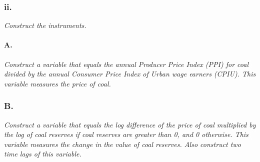 \documentclass[
]{article}
\newenvironment{Shaded}{\begin{snugshade}}{\end{snugshade}}
\newcommand{\CommentTok}[1]{\textcolor[rgb]{0.56,0.35,0.01}{\textit{#1}}}
\newcommand{\ErrorTok}[1]{\textcolor[rgb]{0.64,0.00,0.00}{\textbf{#1}}}
\newcommand{\KeywordTok}[1]{\textcolor[rgb]{0.13,0.29,0.53}{\textbf{#1}}}
\newcommand{\NormalTok}[1]{#1}
\newcommand{\OperatorTok}[1]{\textcolor[rgb]{0.81,0.36,0.00}{\textbf{#1}}}
\newcommand{\OtherTok}[1]{\textcolor[rgb]{0.56,0.35,0.01}{#1}}
\newcommand{\StringTok}[1]{\textcolor[rgb]{0.31,0.60,0.02}{#1}}
\begin{document}
\hypertarget{ii.-2}{%
\subsubsection{ii.}\label{ii.-2}}

\textit{Construct the instruments.}

\hypertarget{a.-6}{%
\paragraph{A.}\label{a.-6}}

\textit{Construct a variable that equals the annual Producer Price Index (PPI) for coal divided by the annual Consumer Price Index of Urban wage earners (CPIU). This variable measures the price of coal.}

\begin{Shaded}
\end{Shaded}

\hypertarget{b.-6}{%
\subsubsection{B.}\label{b.-6}}

\textit{Construct a variable that equals the log difference of the price of coal multiplied by the log of coal reserves if coal reserves are greater than 0, and 0 otherwise. This variable measures the change in the value of coal reserves. Also construct two time lags of this variable.}

\begin{Shaded}
\end{Shaded}
\end{document}
